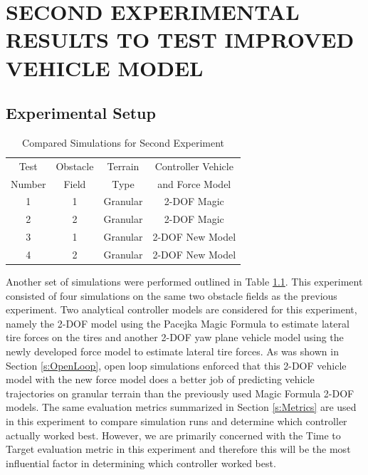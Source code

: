 \documentclass[12pt,onecolumn]{report}
\begin{document}

\chapter{SECOND EXPERIMENTAL RESULTS TO TEST IMPROVED VEHICLE MODEL}\label{c:Exp2}

\section{Experimental Setup}\label{s:ExpSetup2}

\begin{table}
\begin{center}
	\begin{tabular}{||c |c | c | c||} 
		\hline
		Test  & Obstacle & Terrain  & Controller Vehicle \\
		Number &  Field & Type & and Force Model\\ [0.5ex] 	
		\hline\hline
		1 & 1 & Granular & 2-DOF Magic\\ 
		\hline
		2 & 2 & Granular & 2-DOF Magic\\
		\hline
		3 & 1 & Granular & 2-DOF New Model\\
		\hline
		4 & 2 & Granular & 2-DOF New Model\\
		\hline
	\end{tabular}
\end{center}
\caption{Compared Simulations for Second Experiment}
\label{t:TestMatrix2}
\end{table}

Another set of simulations were performed outlined in Table \ref{t:TestMatrix2}. This experiment consisted of four simulations on the same two obstacle fields as the previous experiment. Two analytical controller models are considered for this experiment, namely the 2-DOF model using the Pacejka Magic Formula to estimate lateral tire forces on the tires and another 2-DOF yaw plane vehicle model using the newly developed force model to estimate lateral tire forces. As was shown in Section \ref{s:OpenLoop}, open loop simulations enforced that this 2-DOF vehicle model with the new force model does a better job of predicting vehicle trajectories on granular terrain than the previously used Magic Formula 2-DOF models. The same evaluation metrics summarized in Section \ref{s:Metrics} are used in this experiment to compare simulation runs and determine which controller actually worked best. However, we are primarily concerned with the Time to Target evaluation metric in this experiment and therefore this will be the most influential factor in determining which controller worked best. 
\end{document}
